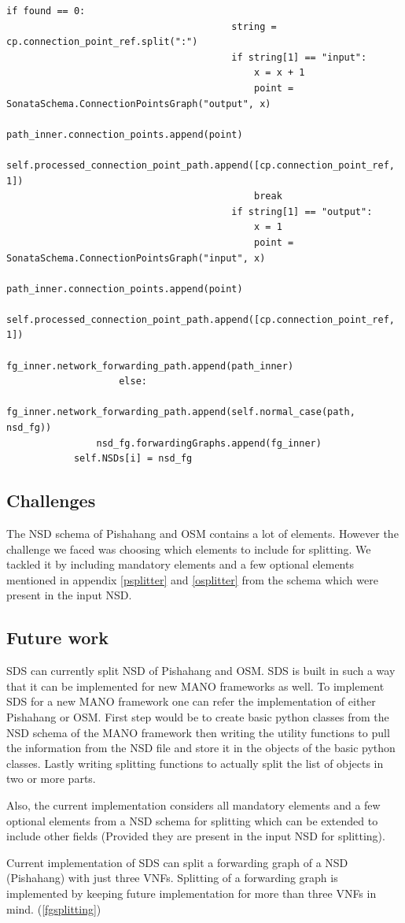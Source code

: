 \begin{lstlisting}[caption=Forwarding Graph Splitting, label=lis:FGSplitting]
                                    if found == 0:
                                        string = cp.connection_point_ref.split(":")
                                        if string[1] == "input":
                                            x = x + 1
                                            point = SonataSchema.ConnectionPointsGraph("output", x)
                                            path_inner.connection_points.append(point)
                                            self.processed_connection_point_path.append([cp.connection_point_ref, 1])
                                            break
                                        if string[1] == "output":
                                            x = 1
                                            point = SonataSchema.ConnectionPointsGraph("input", x)
                                            path_inner.connection_points.append(point)
                                            self.processed_connection_point_path.append([cp.connection_point_ref, 1])
                            fg_inner.network_forwarding_path.append(path_inner)
                    else:
                        fg_inner.network_forwarding_path.append(self.normal_case(path, nsd_fg))
                nsd_fg.forwardingGraphs.append(fg_inner)
            self.NSDs[i] = nsd_fg

\end{lstlisting}

\subsection{Challenges}
The NSD schema of Pishahang and OSM contains a lot of elements. However the challenge we faced was choosing which elements to include for splitting. We tackled it by including mandatory elements and a few optional elements mentioned in appendix \ref{psplitter} and \ref{osplitter} from the schema which were present in the input NSD.
\subsection{Future work}
SDS can currently split NSD of Pishahang and OSM. SDS is built in such a way that it can be implemented for new MANO frameworks as well. To implement SDS for a new MANO framework one can refer the implementation of either Pishahang or OSM. First step would be to create basic python classes from the NSD schema of the MANO framework then writing the utility functions to pull the information from the NSD file and store it in the objects of the basic python classes. Lastly writing splitting functions to actually split the list of objects in two or more parts.

Also, the current implementation considers all mandatory elements and a few optional elements from a NSD schema for splitting which can be extended to include other fields (Provided they are present in the input NSD for splitting).

Current implementation of SDS can split a forwarding graph of a NSD (Pishahang) with just three VNFs. Splitting of a forwarding graph is implemented by keeping future implementation for more than three VNFs in mind. (\ref{fgsplitting})
